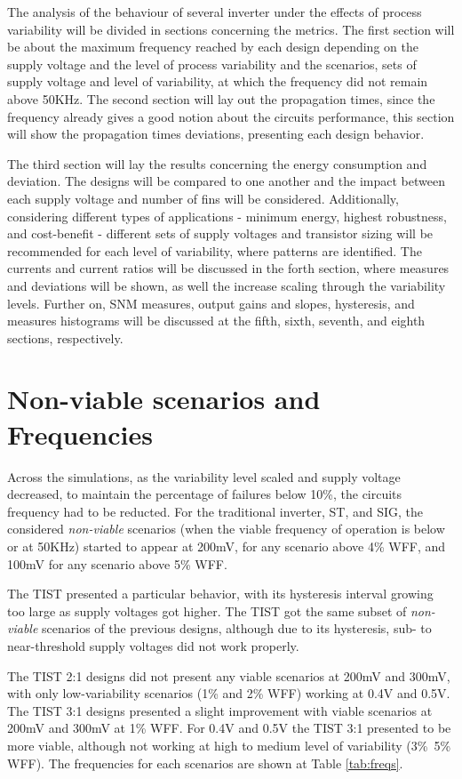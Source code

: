 \documentclass[diss,pgmicro,english]{iiufrgs}
\begin{document}
The analysis of the behaviour of several inverter under the effects of process variability will be divided in sections concerning the metrics. The first section will be about the maximum frequency reached by each design depending on the supply voltage and the level of process variability and the scenarios, sets of supply voltage and level of variability, at which the frequency did not remain above 50KHz. The second section will lay out the propagation times, since the frequency already gives a good notion about the circuits performance, this section will show the propagation times deviations, presenting each design behavior.

The third section will lay the results concerning the energy consumption and deviation. The designs will be compared to one another and the impact between each supply voltage and number of fins will be considered. Additionally, considering different types of applications - minimum energy, highest robustness, and cost-benefit - different sets of supply voltages and transistor sizing will be recommended for each level of variability, where patterns are identified. The currents and current ratios will be discussed in the forth section, where measures and deviations will be shown, as well the increase scaling through the variability levels. Further on, SNM measures, output gains and slopes, hysteresis, and measures histograms will be discussed at the fifth, sixth, seventh, and eighth sections, respectively.

\section{Non-viable scenarios and Frequencies}

Across the simulations, as the variability level scaled and supply voltage decreased, to maintain the percentage of failures below 10\%, the circuits frequency had to be reducted. For the traditional inverter, ST, and SIG, the considered \textit{non-viable} scenarios (when the viable frequency of operation is below or at 50KHz) started to appear at 200mV, for any scenario above 4\% WFF, and 100mV for any scenario above 5\% WFF.

The TIST presented a particular behavior, with its hysteresis interval growing too large as supply voltages got higher. The TIST got the same subset of \textit{non-viable} scenarios of the previous designs, although due to its hysteresis, sub- to near-threshold supply voltages did not work properly.

The TIST 2:1 designs did not present any viable scenarios at 200mV and 300mV, with only low-variability scenarios (1\% and 2\% WFF) working at 0.4V and 0.5V. The TIST 3:1 designs presented a slight improvement with viable scenarios at 200mV and 300mV at 1\% WFF. For 0.4V and 0.5V the TIST 3:1 presented to be more viable, although not working at high to medium level of variability (3\%~5\% WFF). The frequencies for each scenarios are shown at Table \ref{tab:freqs}.
\end{document}
